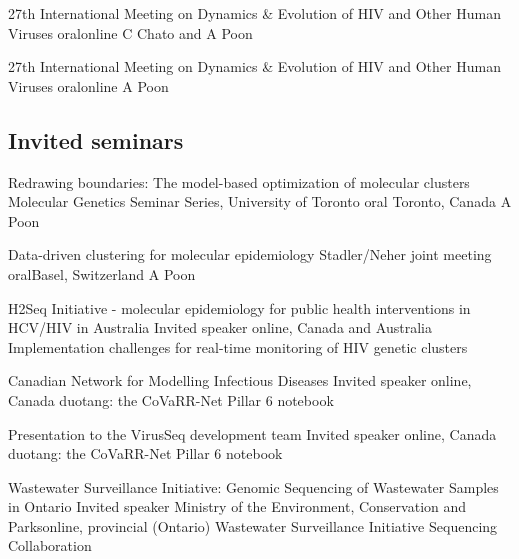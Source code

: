 {27th International Meeting on Dynamics \& Evolution of HIV and Other Human Viruses}
{oral}{online}
{C Chato and A Poon}{}

{27th International Meeting on Dynamics \& Evolution of HIV and Other Human Viruses}
{oral}{online}
{A Poon}{}



\vspace{1em}
\subsection {Invited seminars}


{Redrawing boundaries: The model-based optimization of molecular clusters}
{Molecular Genetics Seminar Series, University of Toronto}
{oral}
{Toronto, Canada}
{A Poon}{}

{Data-driven clustering for molecular epidemiology}
{Stadler/Neher joint meeting}
{oral}{Basel, Switzerland}
{A Poon}{}

{H2Seq Initiative - molecular epidemiology for public health interventions in HCV/HIV in Australia}
{Invited speaker}
{}{online, Canada and Australia}
{Implementation challenges for real-time monitoring of HIV genetic clusters}

{Canadian Network for Modelling Infectious Diseases}
{Invited speaker}
{}{online, Canada}
{duotang: the CoVaRR-Net Pillar 6 notebook}

{Presentation to the VirusSeq development team}
{Invited speaker}
{}{online, Canada}
{duotang: the CoVaRR-Net Pillar 6 notebook}

{Wastewater Surveillance Initiative: Genomic Sequencing of Wastewater Samples in Ontario}
{Invited speaker}
{Ministry of the Environment, Conservation and Parks}{online, provincial (Ontario)}
{Wastewater Surveillance Initiative Sequencing Collaboration}

